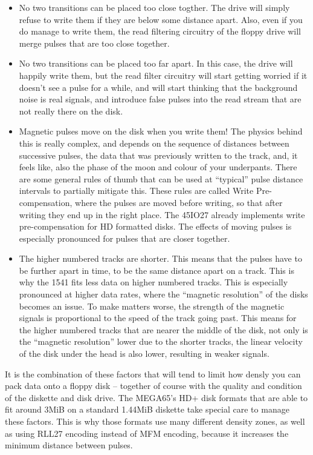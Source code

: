 \begin{itemize}
\item No two transitions can be placed too close togther. The drive will simply refuse to write
  them if they are below some distance apart. Also, even if you do manage to write them, the
  read filtering circuitry of the floppy drive will merge pulses that are too close together.
\item No two transitions can be placed too far apart. In this case, the drive will happily
  write them, but the read filter circuitry will start getting worried if it doesn't see a pulse
  for a while, and will start thinking that the background noise is real signals, and introduce
  false pulses into the read stream that are not really there on the disk.
\item Magnetic pulses move on the disk when you write them! The physics behind this is really
  complex, and depends on the sequence of distances between successive pulses, the data that
  was previously written to the track, and, it feels like, also the phase of the moon and colour
  of your underpants.  There are some general rules of thumb that can be used at ``typical'' pulse
  distance intervals to partially mitigate this. These rules are called Write Pre-compensation, where
  the pulses are moved before writing, so that after writing they end up in the right place.
  The 45IO27 already implements write pre-compensation for HD formatted disks.  The effects of
  moving pulses is especially pronounced for pulses that are closer together.
\item The higher numbered tracks are shorter. This means that the pulses have to be further apart
  in time, to be the same distance apart on a track. This is why the 1541 fits less data on higher
  numbered tracks.  This is especially pronounced at higher data rates, where the ``magnetic resolution''
  of the disks becomes an issue.  To make matters worse, the strength of the magnetic signals
  is proportional to the speed of the track going past. This means for the higher numbered tracks
  that are nearer the middle of the disk, not only is the ``magnetic resolution'' lower due to the
  shorter tracks, the linear velocity of the disk under the head is also lower, resulting in weaker
  signals.
\end{itemize}

It is the combination of these factors that will tend to limit how densly you can pack data onto a
floppy disk -- together of course with the quality and condition of the diskette and disk drive.
The MEGA65's HD+ disk formats that are able to fit around 3MiB on a standard 1.44MiB diskette take
special care to manage these factors. This is why those formats use many different density zones,
as well as using RLL27 encoding instead of MFM encoding, because it increases the minimum distance
between pulses.


